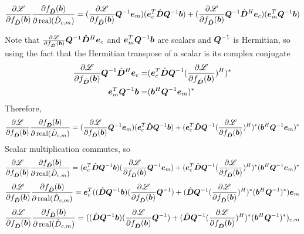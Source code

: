 \begin{appendices}
\begin{equation}
\frac{\partial \mathscr{L}}{\partial f_{\hat{\bm{D}}}(\bm{b})}\frac{\partial f_{\hat{\bm{D}}}(\bm{b})}{\partial \operatorname{real}(\hat{D}_{c,m})} = (\frac{\partial \mathscr{L}}{\partial f_{\hat{\bm{D}}}(\bm{b})}\bm{Q}^{-1}\bm{e}_m)(\bm{e}_c^T\hat{\bm{D}}\bm{Q}^{-1}\bm{b}) + (\frac{\partial \mathscr{L}}{\partial f_{\hat{\bm{D}}}(\bm{b})}\bm{Q}^{-1}\hat{\bm{D}}^H\bm{e}_c)(\bm{e}_m^T\bm{Q}^{-1}\bm{b})
\end{equation}

Note that $\frac{\partial \mathscr{L}}{\partial f_{\hat{\bm{D}}}(\bm{b})}\bm{Q}^{-1}\hat{\bm{D}}^H\bm{e}_c$ and $\bm{e}_m^T\bm{Q}^{-1}\bm{b}$ are scalars and $\bm{Q}^{-1}$ is Hermitian, so using the fact that the Hermitian transpose of a scalar is its complex conjugate
\begin{equation}
\begin{split}
\frac{\partial \mathscr{L}}{\partial f_{\hat{\bm{D}}}(\bm{b})}\bm{Q}^{-1}\hat{\bm{D}}^H\bm{e}_c = & (\bm{e}_c^T\hat{\bm{D}}\bm{Q}^{-1}(\frac{\partial \mathscr{L}}{\partial f_{\hat{\bm{D}}}(\bm{b})})^H)^*
\\
\bm{e}_m^T\bm{Q}^{-1}\bm{b} = & (\bm{b}^H\bm{Q}^{-1}\bm{e}_m)^*
\end{split}
\end{equation}
Therefore,
\begin{equation}
\frac{\partial \mathscr{L}}{\partial f_{\hat{\bm{D}}}(\bm{b})}\frac{\partial f_{\hat{\bm{D}}}(\bm{b})}{\partial \operatorname{real}(\hat{D}_{c,m})} = (\frac{\partial \mathscr{L}}{\partial f_{\hat{\bm{D}}}(\bm{b})}\bm{Q}^{-1}\bm{e}_m)(\bm{e}_c^T\hat{\bm{D}}\bm{Q}^{-1}\bm{b}) + (\bm{e}_c^T\hat{\bm{D}}\bm{Q}^{-1}(\frac{\partial \mathscr{L}}{\partial f_{\hat{\bm{D}}}(\bm{b})})^H)^* (\bm{b}^H\bm{Q}^{-1}\bm{e}_m)^*
\end{equation}
Scalar multiplication commutes, so
\begin{equation}
\frac{\partial \mathscr{L}}{\partial f_{\hat{\bm{D}}}(\bm{b})}\frac{\partial f_{\hat{\bm{D}}}(\bm{b})}{\partial \operatorname{real}(\hat{D}_{c,m})} = (\bm{e}_c^T\hat{\bm{D}}\bm{Q}^{-1}\bm{b})(\frac{\partial \mathscr{L}}{\partial f_{\hat{\bm{D}}}(\bm{b})}\bm{Q}^{-1}\bm{e}_m) + (\bm{e}_c^T\hat{\bm{D}}\bm{Q}^{-1}(\frac{\partial \mathscr{L}}{\partial f_{\hat{\bm{D}}}(\bm{b})})^H)^* (\bm{b}^H\bm{Q}^{-1}\bm{e}_m)^*
\end{equation}
\begin{equation}
\frac{\partial \mathscr{L}}{\partial f_{\hat{\bm{D}}}(\bm{b})}\frac{\partial f_{\hat{\bm{D}}}(\bm{b})}{\partial \operatorname{real}(\hat{D}_{c,m})} = \bm{e}_c^T((\hat{\bm{D}}\bm{Q}^{-1}\bm{b})(\frac{\partial \mathscr{L}}{\partial f_{\hat{\bm{D}}}(\bm{b})}\bm{Q}^{-1}) + (\hat{\bm{D}}\bm{Q}^{-1}(\frac{\partial \mathscr{L}}{\partial f_{\hat{\bm{D}}}(\bm{b})})^H)^* (\bm{b}^H\bm{Q}^{-1})^*)\bm{e}_m
\end{equation}
\begin{equation}
\frac{\partial \mathscr{L}}{\partial f_{\hat{\bm{D}}}(\bm{b})}\frac{\partial f_{\hat{\bm{D}}}(\bm{b})}{\partial \operatorname{real}(\hat{D}_{c,m})} = ((\hat{\bm{D}}\bm{Q}^{-1}\bm{b})(\frac{\partial \mathscr{L}}{\partial f_{\hat{\bm{D}}}(\bm{b})}\bm{Q}^{-1}) + (\hat{\bm{D}}\bm{Q}^{-1}(\frac{\partial \mathscr{L}}{\partial f_{\hat{\bm{D}}}(\bm{b})})^H)^* (\bm{b}^H\bm{Q}^{-1})^*)_{c,m}
\end{equation}


\end{appendices}
